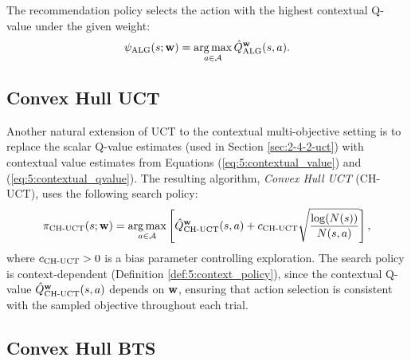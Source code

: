     The recommendation policy selects the action with the highest contextual Q-value under the given weight:
    \begin{align}
        {\psi_{{\textnormal{ALG}}}}(s;\mathbf{w}) = \operatorname*{arg\,max}_{a\in\mathcal{A}} 
            {\hat{Q}^{\mathbf{w}}_{{\textnormal{ALG}}}}(s,a). \label{eq:5:chmcts_rec}
    \end{align}

\subsection{Convex Hull UCT}
\label{sec:5-3-2-chuct}

    Another natural extension of UCT to the contextual multi-objective setting is to replace the scalar Q-value estimates (used in Section \ref{sec:2-4-2-uct}) with contextual value estimates from Equations (\ref{eq:5:contextual_value}) and (\ref{eq:5:contextual_qvalue}). The resulting algorithm, \textit{Convex Hull UCT} (CH-UCT), uses the following search policy:
    \begin{align}
        {\pi_{{\textnormal{CH-UCT}}}}(s;\mathbf{w}) = \operatorname*{arg\,max}_{a\in\mathcal{A}} \left[
            {\hat{Q}^{\mathbf{w}}_{{\textnormal{CH-UCT}}}}(s,a) + {c_{{\textnormal{CH-UCT}}}} 
            \sqrt{\frac{\log(N(s))}{N(s,a)}} \right],
            \label{eq:5:chuct_policy}
    \end{align}
    where ${c_{{\textnormal{CH-UCT}}}} > 0$ is a bias parameter controlling exploration. The search policy is context-dependent (Definition \ref{def:5:context_policy}), since the contextual Q-value ${\hat{Q}^{\mathbf{w}}_{{\textnormal{CH-UCT}}}}(s,a)$ depends on $\mathbf{w}$, ensuring that action selection is consistent with the sampled objective throughout each trial.

\subsection{Convex Hull BTS}
\label{sec:5-3-3-chbts}

